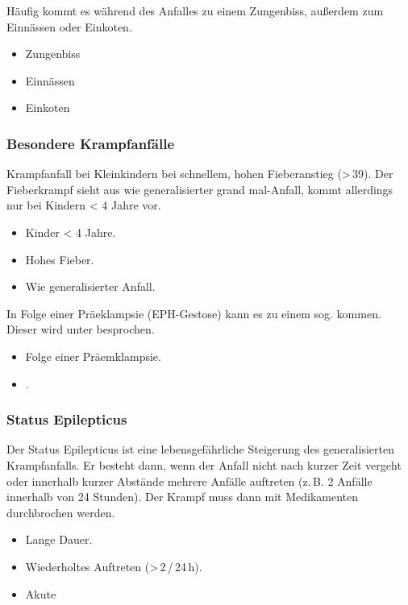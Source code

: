 {
Häufig kommt es während des Anfalles zu einem Zungenbiss,
außerdem zum Einnässen oder Einkoten.
}{
\begin{itemize}
  \item Zungenbiss
  \item Einnässen
  \item Einkoten
\end{itemize}
}{}{}{}



\subsubsection{Besondere Krampfanfälle}

{
\label{topic:fieberkrampf}

Krampfanfall bei Kleinkindern bei schnellem, hohen Fieberanstieg
({\textgreater}\,39{\textcelsius}). Der Fieberkrampf sieht aus wie
generalisierter grand mal-Anfall, kommt allerdings nur bei Kindern {\textless} 4
Jahre vor. 
}{
\begin{itemize}
  \item Kinder {\textless} 4 Jahre.
  \item Hohes Fieber.
  \item Wie generalisierter Anfall.
\end{itemize}
}{}{}{}



{
In Folge einer Präeklampsie (EPH-Gestose)
kann es zu einem sog. 
kommen. Dieser wird unter 
besprochen.
}{
\begin{itemize}
    \item Folge einer Präemklampsie.
    \item {}.
\end{itemize}
}{}{}{}


\subsubsection{Status Epilepticus}
{
Der Status Epilepticus ist eine
lebensgefährliche Steigerung
des generalisierten Krampfanfalls. Er besteht dann, wenn der
Anfall nicht nach kurzer Zeit vergeht oder innerhalb kurzer
Abstände mehrere Anfälle auftreten (z.\,B. 2 Anfälle
innerhalb von 24 Stunden). Der Krampf muss dann mit Medikamenten
durchbrochen werden.
}
{
\begin{itemize}
  \item Lange Dauer.
  \item Wiederholtes Auftreten (>\,2\,/\,24\,h).
  \item Akute 
\end{itemize}
}{}{}{}


